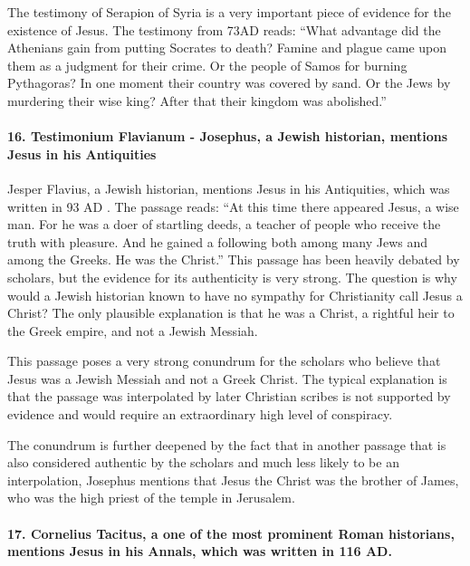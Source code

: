 The testimony of Serapion of Syria is a very important piece of evidence for the existence of Jesus.
The testimony from 73AD reads: ``What advantage did the Athenians gain from putting Socrates to death?
Famine and plague came upon them as a judgment for their crime.
Or the people of Samos for burning Pythagoras?
In one moment their country was covered by sand.
Or the Jews by murdering their wise king?
After that their kingdom was abolished.''

\paragraph{16.
Testimonium Flavianum - Josephus, a Jewish historian, mentions Jesus in his Antiquities}\label{par:testimonium-flavianum---josephus-a-jewish-historian-mentions-jesus-in-his-antiquities}

Jesper Flavius, a Jewish historian, mentions Jesus in his Antiquities, which was written in 93 AD .
The passage reads: ``At this time there appeared Jesus, a wise man.
For he was a doer of startling deeds, a teacher of people who receive the truth with pleasure.
And he gained a following both among many Jews and among the Greeks.
He was the Christ.'' This passage has been heavily debated by scholars, but the evidence for its authenticity is very strong.
The question is why would a Jewish historian known to have no sympathy for Christianity call Jesus a Christ?
The only plausible explanation is that he was a Christ, a rightful heir to the Greek empire, and not a Jewish Messiah.

This passage poses a very strong conundrum for the scholars who believe that Jesus was a Jewish Messiah and not a Greek Christ.
The typical explanation is that the passage was interpolated by later Christian scribes is not supported by evidence and would require an extraordinary high level of conspiracy.

The conundrum is further deepened by the fact that in another passage that is also considered authentic by the scholars and much less likely to be an interpolation, Josephus mentions that Jesus the Christ was the brother of James, who was the high priest of the temple in Jerusalem.

\paragraph{17.
Cornelius Tacitus, a one of the most prominent Roman historians, mentions Jesus in his Annals, which was written in 116 AD.}\label{par:cornelius-tacitus-a-one-of-the-most-prominent-roman-historians-mentions-jesus-in-his-annals-which-was-written-in-116-ad.}

